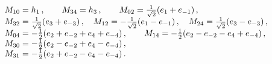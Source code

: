 \begin{equation}\label{llm2.11}
 \begin{array}{l}
 M_{10} = h_1 \, , \qquad M_{34} = h_3 \, ,
\qquad
  M_{02} = \frac{1}{\sqrt{2}} (e_1 +e_{-1} ) \, ,
 \cr
 M_{32} = \frac{1}{\sqrt{2}} (e_3 +e_{-3} )\, ,
 \quad
  M_{12} = -\frac{1}{\sqrt{2}} (e_1 -e_{-1} ) \, ,
  \quad
   M_{24} = \frac{1}{\sqrt{2}} (e_3 - e_{-3} )\, ,
   \cr
    M_{04} = -\frac{1}{{2}} (e_2 + e_{-2}  + e_4 + e_{-4} )\, ,
\qquad
 M_{14} = -\frac{1}{{2}} (e_2 -  e_{-2}  - e_4 + e_{-4} )\, ,
 \cr
 M_{30} = -\frac{1}{{2}} (e_2 -  e_{-2}  + e_4 - e_{-4} )\, ,
\cr
 M_{31} = -\frac{1}{{2}} (e_2 +  e_{-2}  - e_4 - e_{-4} )\, .
 \end{array}
 \end{equation}

